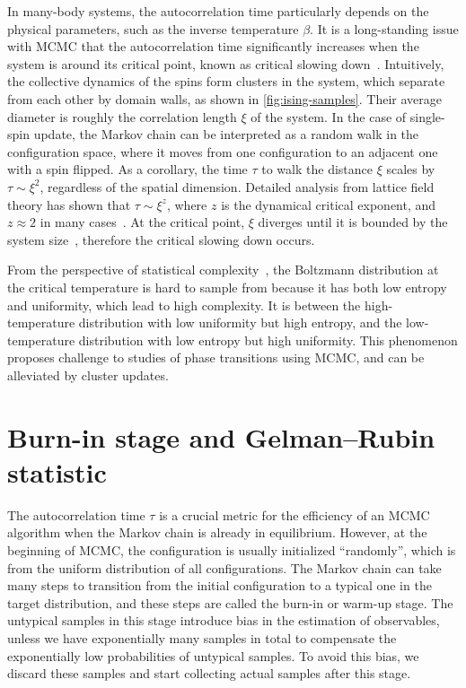 In many-body systems, the autocorrelation time particularly depends on the physical parameters, such as the inverse temperature $\beta$. It is a long-standing issue with MCMC that the autocorrelation time significantly increases when the system is around its critical point, known as critical slowing down~\cite{goodman1989multigrid, wolff1990critical}. Intuitively, the collective dynamics of the spins form clusters in the system, which separate from each other by domain walls, as shown in \cref{fig:ising-samples}. Their average diameter is roughly the correlation length $\xi$ of the system. In the case of single-spin update, the Markov chain can be interpreted as a random walk in the configuration space, where it moves from one configuration to an adjacent one with a spin flipped. As a corollary, the time $\tau$ to walk the distance $\xi$ scales by $\tau \sim \xi^2$, regardless of the spatial dimension. Detailed analysis from lattice field theory has shown that $\tau \sim \xi^z$, where $z$ is the dynamical critical exponent, and $z \approx 2$ in many cases~\cite{hohenberg1977theory}. At the critical point, $\xi$ diverges until it is bounded by the system size~\cite{lubetzky2012critical}, therefore the critical slowing down occurs.

From the perspective of statistical complexity~\cite{lopez1995statistical}, the Boltzmann distribution at the critical temperature is hard to sample from because it has both low entropy and uniformity, which lead to high complexity. It is between the high-temperature distribution with low uniformity but high entropy, and the low-temperature distribution with low entropy but high uniformity. This phenomenon proposes challenge to studies of phase transitions using MCMC, and can be alleviated by cluster updates.

\section{Burn-in stage and Gelman--Rubin statistic}

The autocorrelation time $\tau$ is a crucial metric for the efficiency of an MCMC algorithm when the Markov chain is already in equilibrium. However, at the beginning of MCMC, the configuration is usually initialized ``randomly'', which is from the uniform distribution of all configurations. The Markov chain can take many steps to transition from the initial configuration to a typical one in the target distribution, and these steps are called the burn-in or warm-up stage. The untypical samples in this stage introduce bias in the estimation of observables, unless we have exponentially many samples in total to compensate the exponentially low probabilities of untypical samples. To avoid this bias, we discard these samples and start collecting actual samples after this stage.

